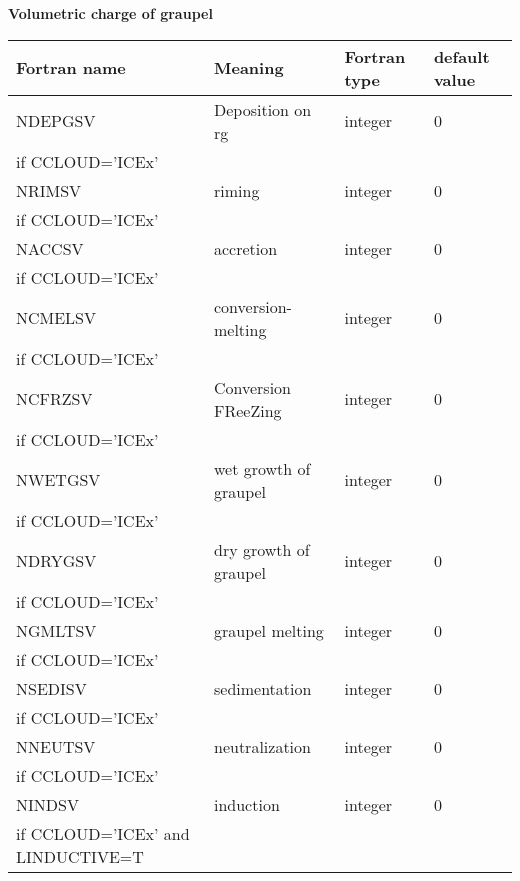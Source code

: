\textbf{Volumetric charge of graupel}
\begin{longtable} {|p{}|p{}|>{\centering}p{}|p{}<{\centering}|}
\hline
Fortran name & Meaning & Fortran type & default value \\
\hline \hline
\endhead
NDEPGSV & Deposition on rg& integer & 0 \\ \nopagebreak
if CCLOUD='ICEx' &&& \\\hline

NRIMSV & riming & integer & 0 \\ \nopagebreak
if CCLOUD='ICEx' &&& \\\hline

NACCSV & accretion & integer & 0 \\ \nopagebreak
if CCLOUD='ICEx' &&& \\\hline

NCMELSV & conversion-melting & integer & 0 \\ \nopagebreak
if CCLOUD='ICEx' &&& \\\hline

NCFRZSV & Conversion FReeZing & integer & 0 \\ \nopagebreak
if CCLOUD='ICEx' &&& \\\hline

NWETGSV & wet growth of graupel & integer & 0 \\ \nopagebreak
if CCLOUD='ICEx' &&& \\\hline

NDRYGSV & dry growth of graupel & integer & 0 \\ \nopagebreak
if CCLOUD='ICEx' &&& \\\hline

NGMLTSV & graupel melting& integer & 0 \\ \nopagebreak
if CCLOUD='ICEx' &&& \\\hline

NSEDISV & sedimentation& integer & 0 \\ \nopagebreak
if CCLOUD='ICEx' &&& \\\hline

NNEUTSV & neutralization & integer & 0 \\ \nopagebreak
if CCLOUD='ICEx' &&& \\\hline

NINDSV & induction & integer & 0 \\ \nopagebreak
if CCLOUD='ICEx' and LINDUCTIVE=T &&& \\\hline
\end{longtable}

